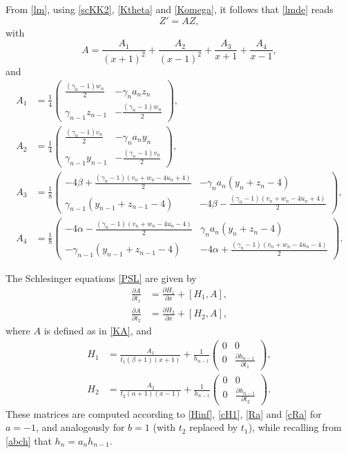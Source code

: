 \documentclass[10pt, reqno]{amsart}
\numberwithin{equation}{section}
\numberwithin{equation}{section}
\begin{document}
From \eqref{lm}, using \eqref{scKK2}, \eqref{Ktheta} and \eqref{Komega}, it follows that \eqref{lmde} reads
\begin{equation*}
Z'=AZ,
\end{equation*}
with
\begin{equation}
A=\frac{A_1}{(x+1)^2}+\frac{A_2}{(x-1)^2}+\frac{A_3}{x+1}+\frac{A_4}{x-1},\label{KA}
\end{equation}
and 
\begin{align*}
A_1&=\frac{1}{4}\begin{pmatrix} \frac{(\gamma_n-1)w_n}{2}&-\gamma_na_nz_n\\
\gamma_{n-1}z_{n-1}&-\frac{(\gamma_n-1)w_n}{2}\end{pmatrix},\\
A_2&=\frac{1}{4}\begin{pmatrix} \frac{(\gamma_n-1)v_n}{2}&-\gamma_na_ny_n\\
\gamma_{n-1}y_{n-1}&-\frac{(\gamma_n-1)v_n}{2}\end{pmatrix},\\
A_3&=\frac{1}{8}\begin{pmatrix} -4\beta+\frac{(\gamma_n-1)(v_n+w_n-4u_n+4)}{2}&-\gamma_na_n(y_n+z_n-4)\\
\gamma_{n-1}(y_{n-1}+z_{n-1}-4)&-4\beta-\frac{(\gamma_n-1)(v_n+w_n-4u_n+4)}{2}\end{pmatrix},\\
A_4&=\frac{1}{8}\begin{pmatrix} -4\alpha-\frac{(\gamma_n-1)(v_n+w_n-4u_n-4)}{2}&\gamma_na_n(y_n+z_n-4)\\
-\gamma_{n-1}(y_{n-1}+z_{n-1}-4)&-4\alpha+\frac{(\gamma_n-1)(v_n+w_n-4u_n-4)}{2}\end{pmatrix}.
\end{align*}

The Schlesinger equations \eqref{PSL} are given by
\begin{align}
\frac{\partial A}{\partial t_1}&=\frac{\partial H_1}{\partial x}+[H_1,A],\label{SLEKK1}\\
\frac{\partial A}{\partial t_2}&=\frac{\partial H_2}{\partial x}+[H_2,A],\label{SLEKK2}
\end{align}
where $A$ is defined as in \eqref{KA}, and 
\begin{align*}
H_1&=\frac{A_1}{t_1(\beta+1)(x+1)}+\frac{1}{h_{n-1}}\begin{pmatrix} 0&0\\ 0&\frac{\partial h_{n-1}}{\partial t_1}\end{pmatrix},\\
H_2&=\frac{A_2}{t_2(\alpha+1)(x-1)}+\frac{1}{h_{n-1}}\begin{pmatrix} 0&0\\ 0&\frac{\partial h_{n-1}}{\partial t_2}\end{pmatrix}.
\end{align*}
These matrices are computed according to \eqref{Hinf}, \eqref{cH1}, \eqref{Ra} and \eqref{cRa} for $a=-1$, and analogously for $b=1$ (with $t_2$ replaced by $t_1$), while recalling from \eqref{abch} that $h_n=a_nh_{n-1}$.
\end{document}
